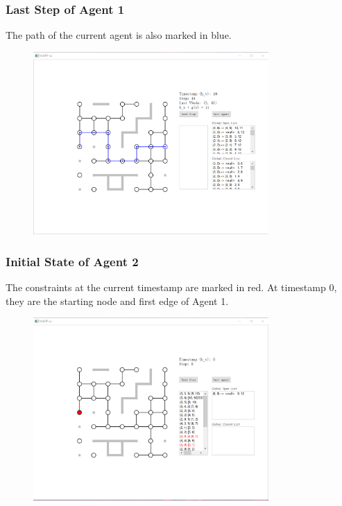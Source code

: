 \documentclass{beamer}
\begin{document}
\begin{frame}
\frametitle{Last Step of Agent 1}
The path of the current agent is also marked in blue.
\begin{figure}
\centering
\includegraphics[width=0.8\textwidth]{3.png}
\end{figure}
\end{frame}

\begin{frame}
\frametitle{Initial State of Agent 2}
The constraints at the current timestamp are marked in red. At timestamp 0, they are the starting node and first edge of Agent 1.
\begin{figure}
\centering
\includegraphics[width=0.8\textwidth]{4.png}
\end{figure}
\end{frame}
\end{document}
